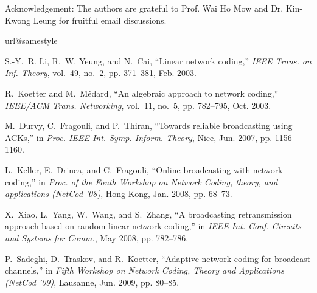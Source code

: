 \documentclass[letterpaper,conference,10pt]{IEEEtran}
\begin{document}
\smallskip
Acknowledgement: The authors are grateful to Prof. Wai Ho Mow and Dr. Kin-Kwong Leung for fruitful email discussions.


%

%

\begin{thebibliography}{10}
\providecommand{\url}[1]{#1}
\csname url@samestyle\endcsname
\providecommand{\newblock}{\relax}
\providecommand{\bibinfo}[2]{#2}
\providecommand{\BIBentrySTDinterwordspacing}{\spaceskip=0pt\relax}
\providecommand{\BIBentryALTinterwordstretchfactor}{4}
\providecommand{\BIBentryALTinterwordspacing}{\spaceskip=\fontdimen2\font plus
\BIBentryALTinterwordstretchfactor\fontdimen3\font minus
  \fontdimen4\font\relax}
\providecommand{\BIBforeignlanguage}[2]{{%
\expandafter\ifx\csname l@#1\endcsname\relax
\typeout{** WARNING: IEEEtran.bst: No hyphenation pattern has been}%
\typeout{** loaded for the language `#1'. Using the pattern for}%
\typeout{** the default language instead.}%
\else
\language=\csname l@#1\endcsname
\fi
#2}}
\providecommand{\BIBdecl}{\relax}
\BIBdecl

S.-Y.~R. Li, R.~W. Yeung, and N.~Cai, ``Linear network coding,'' \emph{IEEE
  Trans. on Inf. Theory}, vol.~49, no.~2, pp. 371--381, Feb. 2003.

R.~Koetter and M.~M\'{e}dard, ``An algebraic approach to network coding,''
  \emph{IEEE/ACM Trans. Networking}, vol.~11, no.~5, pp. 782--795, Oct. 2003.

M.~Durvy, C.~Fragouli, and P.~Thiran, ``Towards reliable broadcasting using
  {ACK}s,'' in \emph{Proc. {IEEE} Int. Symp. Inform. Theory}, Nice, Jun. 2007,
  pp. 1156--1160.

L.~Keller, E.~Drinea, and C.~Fragouli, ``Online broadcasting with network
  coding,'' in \emph{Proc. of the Fouth Workshop on Network Coding, theory, and
  applications (Net{C}od '08)}, Hong Kong, Jan. 2008, pp. 68--73.

X.~Xiao, L.~Yang, W.~Wang, and S.~Zhang, ``A broadcasting retransmission
  approach based on random linear network coding,'' in \emph{IEEE Int. Conf.
  Circuits and Systems for Comm.}, May 2008, pp. 782--786.

P.~Sadeghi, D.~Traskov, and R.~Koetter, ``Adaptive network coding for broadcast
  channels,'' in \emph{Fifth Workshop on Network Coding, Theory and
  Applications (Net{C}od '09)}, Lausanne, Jun. 2009, pp. 80--85.


\end{thebibliography}
\end{document}
